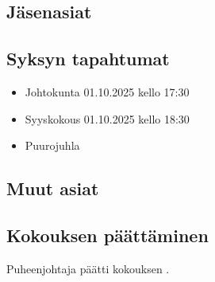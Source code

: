 \documentclass[a4paper,12pt]{article}
\begin{document}
\subsection{Jäsenasiat}
\subsection{Syksyn tapahtumat}
\begin{itemize}
\item{Johtokunta 01.10.2025 kello 17:30}
\item{Syyskokous 01.10.2025 kello 18:30}
\item{Puurojuhla}
\end{itemize}
\subsection{Muut asiat}
\subsection{Kokouksen päättäminen}
Puheenjohtaja päätti kokouksen .
\end{document}
